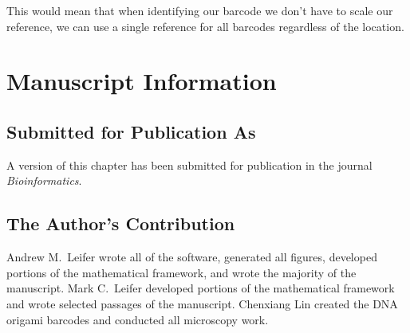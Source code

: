 This would mean that when identifying our barcode we don't have to scale our reference, we can use a single reference for all barcodes regardless of the location.


\section{Manuscript Information}
\subsection{Submitted for Publication As}
A version of this chapter has been submitted for publication in the journal \textit{Bioinformatics}.

\subsection{The Author's Contribution}
Andrew M.~Leifer wrote all of the software, generated all figures, developed portions of the mathematical framework, and wrote the majority of the manuscript. Mark C.~Leifer developed portions of the mathematical framework and wrote selected passages of the manuscript. Chenxiang Lin created the DNA origami barcodes and conducted all microscopy work. 
 